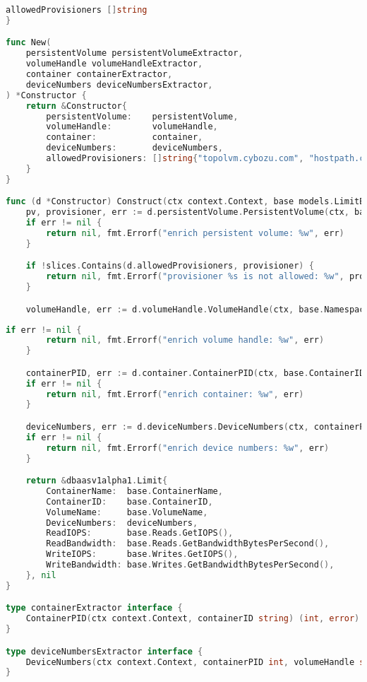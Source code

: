 \begin{appendices}
\begin{lstlisting}[language=Go,label=lst:podiolimit_gen5, caption={Генерация PodIOLimit (продолжение листинга~\ref{lst:podiolimit_gen4})}]
	allowedProvisioners []string
}

func New(
	persistentVolume persistentVolumeExtractor,
	volumeHandle volumeHandleExtractor,
	container containerExtractor,
	deviceNumbers deviceNumbersExtractor,
) *Constructor {
	return &Constructor{
		persistentVolume:    persistentVolume,
		volumeHandle:        volumeHandle,
		container:           container,
		deviceNumbers:       deviceNumbers,
		allowedProvisioners: []string{"topolvm.cybozu.com", "hostpath.csi.k8s.io", "topolvm.io"},
	}
}

func (d *Constructor) Construct(ctx context.Context, base models.LimitBase) (*dbaasv1alpha1.Limit, error) {
	pv, provisioner, err := d.persistentVolume.PersistentVolume(ctx, base.Namespace, base.PVCName)
	if err != nil {
		return nil, fmt.Errorf("enrich persistent volume: %w", err)
	}

	if !slices.Contains(d.allowedProvisioners, provisioner) {
		return nil, fmt.Errorf("provisioner %s is not allowed: %w", provisioner, models.ErrUnsupportedProvisioner)
	}

	volumeHandle, err := d.volumeHandle.VolumeHandle(ctx, base.Namespace, pv)
\end{lstlisting}

\begin{lstlisting}[language=Go,label=lst:podiolimit_gen6, caption={Генерация PodIOLimit (продолжение листинга~\ref{lst:podiolimit_gen5})}]
	if err != nil {
		return nil, fmt.Errorf("enrich volume handle: %w", err)
	}

	containerPID, err := d.container.ContainerPID(ctx, base.ContainerID)
	if err != nil {
		return nil, fmt.Errorf("enrich container: %w", err)
	}

	deviceNumbers, err := d.deviceNumbers.DeviceNumbers(ctx, containerPID, volumeHandle)
	if err != nil {
		return nil, fmt.Errorf("enrich device numbers: %w", err)
	}

	return &dbaasv1alpha1.Limit{
		ContainerName:  base.ContainerName,
		ContainerID:    base.ContainerID,
		VolumeName:     base.VolumeName,
		DeviceNumbers:  deviceNumbers,
		ReadIOPS:       base.Reads.GetIOPS(),
		ReadBandwidth:  base.Reads.GetBandwidthBytesPerSecond(),
		WriteIOPS:      base.Writes.GetIOPS(),
		WriteBandwidth: base.Writes.GetBandwidthBytesPerSecond(),
	}, nil
}

type containerExtractor interface {
	ContainerPID(ctx context.Context, containerID string) (int, error)
}

type deviceNumbersExtractor interface {
	DeviceNumbers(ctx context.Context, containerPID int, volumeHandle string) (string, error)
}
\end{lstlisting}


\end{appendices}
